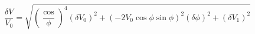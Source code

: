 \begin{equation}
\label{eq:delta_V_Malus}
\frac{\delta V}{V_0} = \sqrt{ \left(\frac\cos{\phi}\right)^4(\delta V_0)^2 + \left(-2 V_0 \cos{\phi}\sin{\phi} \right)^2(\delta \phi)^2+ (\delta V_1)^2}
\end{equation}